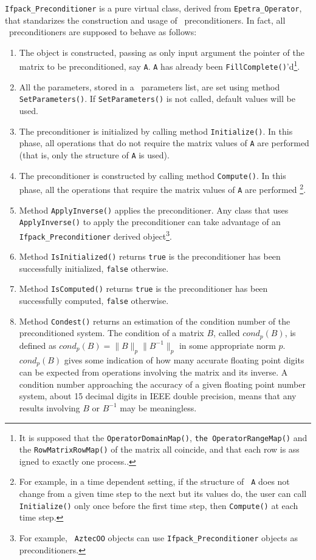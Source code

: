 \verb!Ifpack_Preconditioner! is a pure virtual class, derived from
\verb!Epetra_Operator!, that standarizes the construction and usage of \ifpack\
preconditioners. In fact, all \ifpack\ preconditioners are supposed to behave
as follows:
\begin{enumerate}
\item The object is constructed, passing as only input argument the
pointer of the matrix to be preconditioned, say {\tt A}. {\tt A} has already
been {\tt FillComplete()}'d\footnote{It is supposed that the {\tt OperatorDomainMap()}, {\tt the OperatorRangeMap()}
and
the {\tt RowMatrixRowMap()} of the matrix all coincide, and that each row is ass
igned
to exactly one process..}.
%
\item All the parameters, stored in a \teuchos\ parameters list, are
set using method \verb!SetParameters()!. If \verb!SetParameters()! is not
called, default values will be used.
%
\item The preconditioner is initialized by calling method \verb!Initialize()!.
In this phase, all operations that do not require the matrix values of {\tt A}
are performed (that is, only the structure of {\tt A} is used).
%
\item The preconditioner is constructed by calling method \verb!Compute()!.
In this phase, all the operations that require the matrix values of {\tt A}
are performed
\footnote{For example, in a time dependent setting, if the structure of {\tt
  A} does not change from a given time step to the next but its values do,
  the user can call {\tt Initialize()} only once before the first time step,
  then {\tt Compute()} at each time step.}.
%
\item Method \verb!ApplyInverse()! applies the preconditioner. Any class that
uses \verb!ApplyInverse()! to apply the preconditioner can take advantage of
an \verb!Ifpack_Preconditioner! derived object\footnote{For example, {\tt
  AztecOO} objects can use {\tt Ifpack\_Preconditioner} objects as
    preconditioners.}.
%
\item Method \verb!IsInitialized()! returns {\tt true} is the preconditioner has
been successfully initialized, {\tt false} otherwise.
%
\item Method \verb!IsComputed()! returns {\tt true} is the preconditioner has
been successfully computed, {\tt false} otherwise.
%
\item Method \verb!Condest()! returns an estimation of the condition
number of the preconditioned system.
The condition of a matrix $B$, called $cond_p(B)$, is defined as
$cond_p(B) = \|B\|_p\|B^{-1}\|_p$ in some appropriate norm $p$. 
$cond_p(B)$
gives some indication of how many accurate floating point
digits can be expected from operations involving the matrix and its
inverse.  A condition number approaching the accuracy of a given
floating point number system, about 15 decimal digits in IEEE double
precision, means that any results involving $B$ or $B^{-1}$ may be
meaningless.


\end{enumerate}
